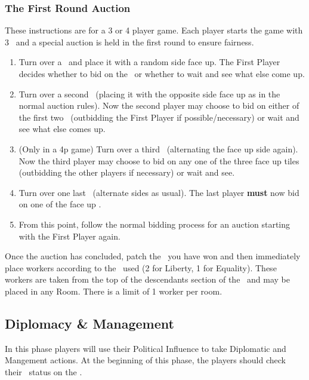 \documentclass[10pt,twocolumn]{article}
\begin{document}
\subsubsection{The First Round Auction}
These instructions are for a 3 or 4 player game.
Each player starts the game with 3 \money\ and a special auction is held in the first round to ensure fairness. 
\begin{enumerate}
\item Turn over a \landcard\ and place it with a random side face up. The First Player decides whether to bid on the \landcard\ or whether to wait and see what else come up.
\item Turn over a second \landcard\ (placing it with the opposite side face up as in the normal auction rules). Now the second player may choose to bid on either of the first two \landcards\ (outbidding the First Player if possible/necessary) or wait and see what else comes up.
\item (Only in a 4p game) Turn over a third \landcard\ (alternating the face up side again). Now the third player may choose to bid on any one of the three face up tiles (outbidding the other players if necessary) or wait and see.
\item Turn over one last \landcard\ (alternate sides as usual). The last player \textbf{must} now bid on one of the face up \landcards.
\item From this point, follow the normal bidding process for an auction starting with the First Player again.
\end{enumerate}
Once the auction has concluded, patch the \landcard\ you have won and then immediately place workers according to the \baseland\ used (2 for Liberty, 1 for Equality). These workers are taken from the top of the descendants section of the \psb\ and may be placed in any Room. There is a limit of 1 worker per room.
\subsection{Diplomacy \& Management}
In this phase players will use their Political Influence to take Diplomatic and Mangement actions. At the beginning of this phase, the players should check their \pol\ status on the \psb.

\end{document}
